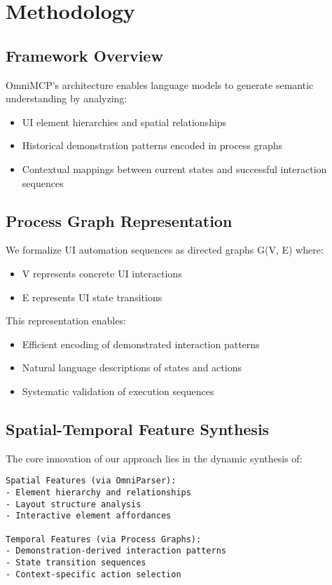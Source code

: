 \documentclass{article}
\begin{document}
\section{Methodology}

\subsection{Framework Overview}
OmniMCP's architecture enables language models to generate semantic understanding by analyzing:
\begin{itemize}
    \item UI element hierarchies and spatial relationships
    \item Historical demonstration patterns encoded in process graphs
    \item Contextual mappings between current states and successful interaction sequences
\end{itemize}

\subsection{Process Graph Representation}
We formalize UI automation sequences as directed graphs G(V, E) where:
\begin{itemize}
    \item V represents concrete UI interactions
    \item E represents UI state transitions
\end{itemize}

This representation enables:
\begin{itemize}
    \item Efficient encoding of demonstrated interaction patterns
    \item Natural language descriptions of states and actions
    \item Systematic validation of execution sequences
\end{itemize}

\subsection{Spatial-Temporal Feature Synthesis}
The core innovation of our approach lies in the dynamic synthesis of:

\begin{verbatim}
Spatial Features (via OmniParser):
- Element hierarchy and relationships
- Layout structure analysis
- Interactive element affordances

Temporal Features (via Process Graphs):
- Demonstration-derived interaction patterns
- State transition sequences
- Context-specific action selection
\end{verbatim}
\end{document}
